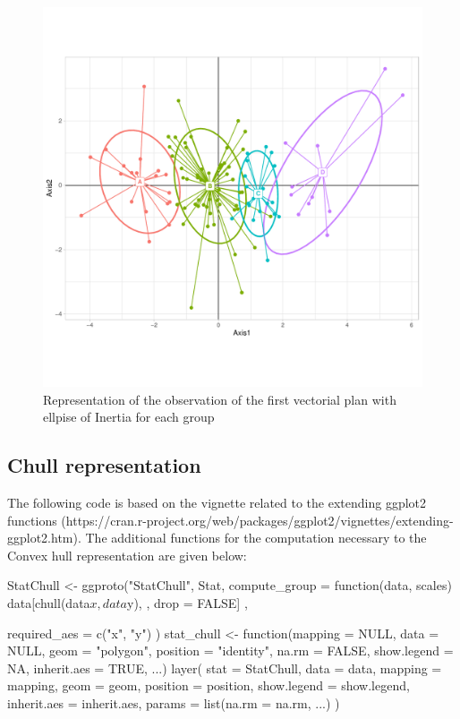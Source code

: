 \documentclass[a4paper,10pt]{article}
\begin{document}
\begin{figure}[H]
\begin{center}
\begin{Schunk}
\begin{Sinput}
\end{Sinput}
\end{Schunk}
\includegraphics{figs/sweave-liclassSTAR}
\caption{Representation of the observation of the first vectorial plan with ellpise of Inertia for each group}
\label{fig:liclassSTAR}
\end{center}
\end{figure}



\subsection{Chull representation}

The following code is based on the vignette related to the extending ggplot2 functions (https://cran.r-project.org/web/packages/ggplot2/vignettes/extending-ggplot2.htm). The additional functions for the computation necessary to the Convex hull representation are given below:

\begin{Schunk}
\begin{Sinput}
  StatChull <- ggproto("StatChull", Stat,
   compute_group = function(data, scales) {
     data[chull(data$x, data$y), , drop = FALSE]
   },
   
   required_aes = c("x", "y")
 )
  stat_chull <- function(mapping = NULL, data = NULL, geom = "polygon",
                        position = "identity", na.rm = FALSE, show.legend = NA, 
                        inherit.aes = TRUE, ...) {
   layer(
     stat = StatChull, data = data, mapping = mapping, geom = geom, 
     position = position, show.legend = show.legend, inherit.aes = inherit.aes,
     params = list(na.rm = na.rm, ...)
   )
 }
\end{Sinput}
\end{Schunk}
\end{document}
